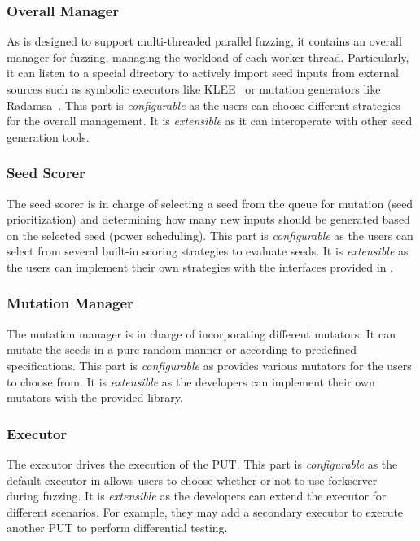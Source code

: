 \subsubsection{Overall Manager}
As {\FOT} is designed to support multi-threaded parallel fuzzing, it contains an overall manager for fuzzing, managing the workload of each worker thread.
Particularly, it can listen to a special directory to actively import seed inputs from external sources such as symbolic executors like KLEE~\cite{klee} or mutation generators like Radamsa~\cite{radamsa}.
This part is \textit{configurable} as the users can choose different strategies for the overall management.
It is \textit{extensible} as it can interoperate with other seed generation tools.


\subsubsection{Seed Scorer}
The seed scorer is in charge of selecting a seed from the queue for mutation (seed prioritization) and determining how many new inputs should be generated based on the selected seed (power scheduling).
This part is \textit{configurable} as the users can select from several built-in scoring strategies to evaluate seeds.
It is \textit{extensible} as the users can implement their own strategies with the interfaces provided in {\FOT}.


\subsubsection{Mutation Manager}
The mutation manager is in charge of incorporating different mutators.
It can mutate the seeds in a pure random manner or according to predefined specifications.
This part is \textit{configurable} as {\FOT} provides various mutators for the users to choose from.
It is \textit{extensible} as the developers can implement their own mutators with the provided library.

\subsubsection{Executor}
The executor drives the execution of the PUT.
This part is \textit{configurable} as the default executor in {\FOT} allows users to choose whether or not to use forkserver~\cite{afl} during fuzzing.
It is \textit{extensible} as the developers can extend the executor for different scenarios.
For example, they may add a secondary executor to execute another PUT to perform differential testing.

